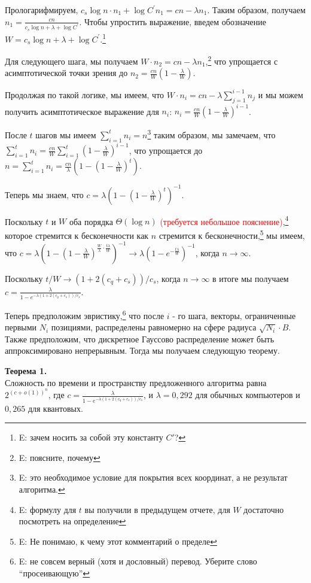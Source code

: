 \documentclass[a4paper,11pt]{article}
\begin{document}
Прологарифмируем, $c_s \log{n} \cdot n_1 + \log{C^{'}} n_1 = cn - \lambda n_1$. Таким образом, получаем $n_1 = \frac{cn}{c_s \log{n} + \lambda + \log{C^{'}}}$. Чтобы упростить выражение, введем обозначение $W=c_s \log{n} + \lambda + \log{C^{'}}$.\footnote{E: зачем носить за собой эту константу $C'$?}

Для следующего шага, мы получаем $W \cdot n_2 = cn - \lambda n_1$,\footnote{E: поясните, почему} что упрощается с асимптотической точки зрения до $n_2 = \frac{cn}{W} (1 - \frac{\lambda}{W})$.

Продолжая по такой логике, мы имеем, что $W \cdot n_i = cn - \lambda \sum_{j=1}^{i-1}  n_j$ и мы можем получить асимптотическое выражение для $n_i$: $n_i = \frac{cn}{W} (1 - \frac{\lambda}{W})^{i-1}$.

После $t$ шагов мы имеем $\sum_{i=1}^t n_i = n$\footnote{E: это необходимое условие для покрытия всех координат, а не результат алгоритма.} таким образом, мы замечаем, что $\sum_{i=1}^t n_i = \frac{cn}{W} \sum_{i=1}^t (1 - \frac{\lambda}{W})^{i-1}$, что упрощается до $n = \sum_{i=1}^t n_i = \frac{cn}{\lambda} (1-(1-\frac{\lambda}{W})^t)$.

Теперь мы знаем, что $c=\lambda (1-(1-\frac{\lambda}{W})^t)^{-1}$.

Поскольку $t$ и $W$ оба порядка $\Theta(\log{n})$  \textcolor{red}{(требуется небольшое пояснение)},\footnote{E: формулу для $t$ вы получили в предыдущем отчете, для $W$ достаточно посмотреть на определение } которое стремится к бесконечности как $n$ стремится к бесконечности,\footnote{E: Не понимаю, к чему этот комментарий о пределе} мы имеем, что $c=\lambda (1-(1-\frac{\lambda}{W})^{\frac{W}{\lambda} \cdot \frac{t \lambda}{W}})^{-1} \rightarrow \lambda (1-e^{- \frac{t \lambda}{W}})^{-1}$, когда $n \rightarrow \infty$.

Поскольку $t/W \rightarrow (1+2(c_q + c_s))/c_s$, когда $n \rightarrow \infty$ в итоге мы получаем $c=\frac{\lambda}{1-e^{- \lambda(1+2(c_q + c_s))/c_s}}$.

Теперь предположим эвристику,\footnote{E: не совсем верный (хотя и дословный) перевод. Уберите слово ``просеивающую''} что после $i$ - го шага, векторы, ограниченные первыми $N_i$ позициями, распределены равномерно на сфере радиуса $\sqrt{N_i}\cdot B$. Также предположим, что дискретное Гауссово распределение может быть аппроксимировано непрерывным. Тогда мы получаем следующую теорему.

\textbf{Теорема 1.}\\
Сложность по времени и пространству предложенного алгоритма равна $2^{(c+o(1))^n}$, где $c=\frac{\lambda}{1-e^{- \lambda(1+2(c_q + c_s))/c_s}}$, и $\lambda = 0,292$ для обычных компьютеров и $0,265$ для квантовых.
\end{document}
